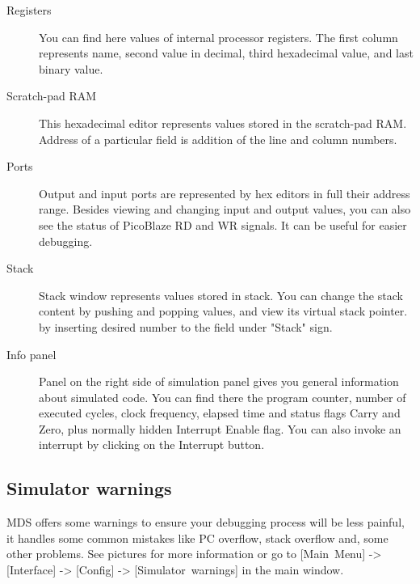     \begin{description}
        \item [Registers]
            You can find here values of internal processor registers. The first column represents name, second value in
            decimal, third hexadecimal value, and last binary value.
        \item [Scratch-pad RAM]
            This hexadecimal editor represents values stored in the scratch-pad RAM. Address of a particular field is
            addition of the line and column numbers.
        \item [Ports]
            Output and input ports are represented by hex editors in full their address range. Besides viewing and
            changing input and output values, you can also see the status of PicoBlaze RD and WR signals. It can be
            useful for easier debugging.
        \item [Stack]
            Stack window represents values stored in stack. You can change the stack content by pushing and popping
            values, and view its virtual stack pointer.
        by inserting desired number to the field under "Stack" sign.
        \item [Info panel]
            Panel on the right side of simulation panel gives you general information about simulated code. You can find
            there the program counter, number of executed cycles, clock frequency, elapsed time and status flags Carry
            and Zero, plus normally hidden Interrupt Enable flag. You can also invoke an interrupt by clicking on the
            Interrupt button.
    \end{description}

    \subsection{Simulator warnings}
        MDS offers some warnings to ensure your debugging process will be less painful, it handles some common mistakes
        like PC overflow, stack overflow and, some other problems. See pictures for more information or go to
        [Main~Menu] -> [Interface] -> [Config] -> [Simulator~warnings] in the main window.


